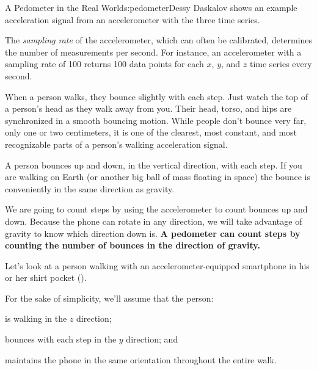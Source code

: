 \begin{aosachapter}{A Pedometer in the Real World}{s:pedometer}{Dessy Daskalov}
 shows an example
acceleration signal from an accelerometer with the three time series.


The \emph{sampling rate} of the accelerometer, which can often be
calibrated, determines the number of measurements per second. For
instance, an accelerometer with a sampling rate of 100 returns 100 data
points for each $x$, $y$, and $z$ time series every second.

\label{lets-talk-about-a-walk}

When a person walks, they bounce slightly with each step. Just watch the
top of a person's head as they walk away from you. Their head, torso,
and hips are synchronized in a smooth bouncing motion. While people
don't bounce very far, only one or two centimeters, it is one of the
clearest, most constant, and most recognizable parts of a person's
walking acceleration signal.

A person bounces up and down, in the vertical direction, with each step.
If you are walking on Earth (or another big ball of mass floating in
space) the bounce is conveniently in the same direction as gravity.

We are going to count steps by using the accelerometer to count bounces
up and down. Because the phone can rotate in any direction, we will take
advantage of gravity to know which direction down is. \textbf{A
pedometer can count steps by counting the number of bounces in the
direction of gravity.}

Let's look at a person walking with an accelerometer-equipped smartphone
in his or her shirt pocket ().


For the sake of simplicity, we'll assume that the person:

\begin{aosaitemize}

\item
  is walking in the $z$ direction;
\item
  bounces with each step in the $y$ direction; and
\item
  maintains the phone in the same orientation throughout the entire
  walk.
\end{aosaitemize}


\end{aosachapter}
